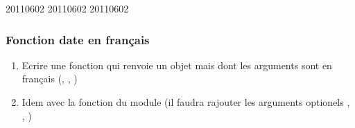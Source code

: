 \documentclass[letterpaper,10pt,english]{sphinxhowto}
\begin{document}
\begin{sphinxVerbatim}[commandchars=\\\{\}]
    

  

  \PYG{p}{[}  \PYG{p}{]}


    

\end{sphinxVerbatim}

\begin{sphinxVerbatim}[commandchars=\\\{\}]
2011\PYGZhy{}06\PYGZhy{}02
2011\PYGZhy{}06\PYGZhy{}02
2011\PYGZhy{}06\PYGZhy{}02
\end{sphinxVerbatim}


\subsubsection{Fonction date en français}
\label{\detokenize{cours1_fonctions_corr_exercices:fonction-date-en-francais}}\begin{enumerate}
%
\item {} 
\sphinxAtStartPar
Ecrire une fonction  qui renvoie un objet  mais dont les arguments sont en français (, , )

\item {} 
\sphinxAtStartPar
Idem avec la fonction  du module  (il faudra rajouter les arguments optionels , , )

\end{enumerate}
\end{document}
